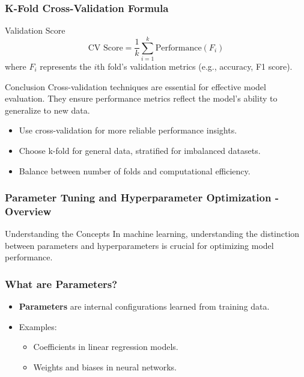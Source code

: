 \documentclass[aspectratio=169]{beamer}
\begin{document}
\begin{frame}[fragile]
    \frametitle{K-Fold Cross-Validation Formula}
    
    \begin{block}{Validation Score}
        \[
        \text{CV Score} = \frac{1}{k} \sum_{i=1}^{k} \text{Performance}(F_i)
        \]
        where \(F_i\) represents the $i$th fold's validation metrics (e.g., accuracy, F1 score).
    \end{block}

    \begin{block}{Conclusion}
        Cross-validation techniques are essential for effective model evaluation. They ensure performance metrics reflect the model's ability to generalize to new data.
    \end{block}

    \begin{itemize}
        \item Use cross-validation for more reliable performance insights.
        \item Choose k-fold for general data, stratified for imbalanced datasets.
        \item Balance between number of folds and computational efficiency.
    \end{itemize}
\end{frame}

\begin{frame}[fragile]
    \frametitle{Parameter Tuning and Hyperparameter Optimization - Overview}
    \begin{block}{Understanding the Concepts}
        In machine learning, understanding the distinction between parameters and hyperparameters is crucial for optimizing model performance.
    \end{block}
\end{frame}

\begin{frame}[fragile]
    \frametitle{What are Parameters?}
    \begin{itemize}
        \item \textbf{Parameters} are internal configurations learned from training data.
        \item Examples:
            \begin{itemize}
                \item Coefficients in linear regression models.
                \item Weights and biases in neural networks.
            \end{itemize}
    \end{itemize}
\end{frame}
\end{document}

